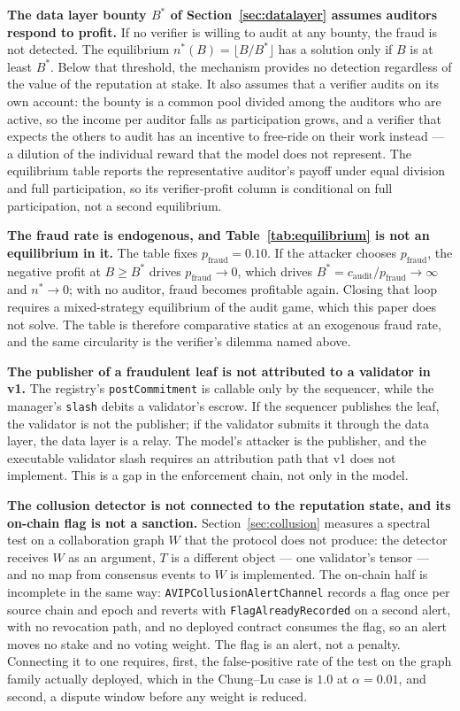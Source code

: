 \documentclass[11pt,a4paper]{article}
\numberwithin{equation}{section}
\numberwithin{table}{section}
\begin{document}
\textbf{The data layer bounty $B^*$ of Section~\ref{sec:datalayer} assumes auditors respond to profit.} If no verifier is willing to audit at any bounty, the fraud is not detected. The equilibrium $n^*(B) = \lfloor B/B^* \rfloor$ has a solution only if $B$ is at least $B^*$. Below that threshold, the mechanism provides no detection regardless of the value of the reputation at stake. It also assumes that a verifier audits on its own account: the bounty is a common pool divided among the auditors who are active, so the income per auditor falls as participation grows, and a verifier that expects the others to audit has an incentive to free-ride on their work instead --- a dilution of the individual reward that the model does not represent. The equilibrium table reports the representative auditor's payoff under equal division and full participation, so its verifier-profit column is conditional on full participation, not a second equilibrium.

\textbf{The fraud rate is endogenous, and Table~\ref{tab:equilibrium} is not an equilibrium in it.} The table fixes $p_{\mathrm{fraud}} = 0.10$. If the attacker chooses $p_{\mathrm{fraud}}$, the negative profit at $B \geq B^*$ drives $p_{\mathrm{fraud}} \to 0$, which drives $B^* = c_{\mathrm{audit}}/p_{\mathrm{fraud}} \to \infty$ and $n^* \to 0$; with no auditor, fraud becomes profitable again. Closing that loop requires a mixed-strategy equilibrium of the audit game, which this paper does not solve. The table is therefore comparative statics at an exogenous fraud rate, and the same circularity is the verifier's dilemma named above.

\textbf{The publisher of a fraudulent leaf is not attributed to a validator in v1.} The registry's \texttt{postCommitment} is callable only by the sequencer, while the manager's \texttt{slash} debits a validator's escrow. If the sequencer publishes the leaf, the validator is not the publisher; if the validator submits it through the data layer, the data layer is a relay. The model's attacker is the publisher, and the executable validator slash requires an attribution path that v1 does not implement. This is a gap in the enforcement chain, not only in the model.

\textbf{The collusion detector is not connected to the reputation state, and its on-chain flag is not a sanction.} Section~\ref{sec:collusion} measures a spectral test on a collaboration graph $W$ that the protocol does not produce: the detector receives $W$ as an argument, $T$ is a different object --- one validator's tensor --- and no map from consensus events to $W$ is implemented. The on-chain half is incomplete in the same way: \texttt{AVIPCollusionAlertChannel} records a flag once per source chain and epoch and reverts with \texttt{FlagAlreadyRecorded} on a second alert, with no revocation path, and no deployed contract consumes the flag, so an alert moves no stake and no voting weight. The flag is an alert, not a penalty. Connecting it to one requires, first, the false-positive rate of the test on the graph family actually deployed, which in the Chung--Lu case is $1.0$ at $\alpha = 0.01$, and second, a dispute window before any weight is reduced.
\end{document}
